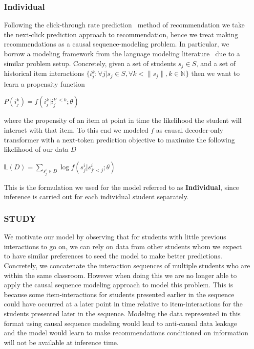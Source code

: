 \documentclass{article}
\begin{document}
\subsubsection{Individual}
Following the click-through rate prediction~\cite{wang2020survey} method of recommendation we take the next-click prediction approach to recommendation, hence we treat making recommendations as a causal sequence-modeling problem. In particular, we borrow a modeling framework from the language modeling literature~\cite{radford2018improving} due to a similar problem setup. Concretely, given a set of students  $s_j \in S$, and a set of historical item interactions $\{i^k_j : \forall j | s_j \in S,  \forall k < \|s_j\|, k \in \mathbb{N} \} $ then we want to learn a propensity function
\begin{center}
    $P({i^k_j }) = f(i^k_j |  i^{k'<k}_j ; \theta)$
\end{center}
where the propensity of an item at point in time the likelihood the student will interact with that item.
To this end we modeled $f$ as causal decoder-only transformer with a next-token prediction objective to maximize the following likelihood of our data $D$
\begin{center}
    $\mathbb{L}(D) = \sum_{s^i_j \in D} \log  f(s^i_j | s^i_{j'<j} ; \theta)$
\end{center}
This is the formulation we used for the model referred to as \textbf{Individual}, since inference is carried out for each individual student separately.

\subsubsection{STUDY}

We motivate our model by observing that for students with little previous interactions to go on, we can rely on data from other students whom we expect to have similar preferences to seed the model to make better predictions. Concretely, we concatenate the interaction sequences of multiple students who are within the same classroom. However when doing this we are no longer able to apply the causal sequence modeling approach to model this problem. This is because some item-interactions for students presented earlier in the sequence could have occurred at a later point in time relative to item-interactions for the students presented later in the sequence. Modeling the data represented in this format using causal sequence modeling would lead to anti-causal data leakage and the model would learn to make recommendations conditioned on information will not be available at inference time. 
\end{document}
